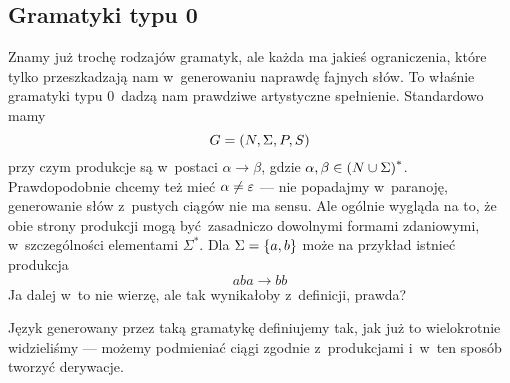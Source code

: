 \subsection{Gramatyki typu 0}
Znamy już trochę rodzajów gramatyk, ale każda ma jakieś ograniczenia, które tylko przeszkadzają nam w~generowaniu naprawdę fajnych słów. To właśnie gramatyki typu 0~dadzą nam prawdziwe artystyczne spełnienie. Standardowo mamy
\[
	G = \left(N, \Sigma, P, S\right)
\]
przy czym produkcje są w~postaci \(\alpha \rightarrow \beta\), gdzie \(\alpha, \beta \in \left(N \cup \Sigma\right)^*\). Prawdopodobnie chcemy też mieć \(\alpha \neq \varepsilon\) --- nie popadajmy w~paranoję, generowanie słów z~pustych ciągów nie ma sensu. Ale ogólnie wygląda na to, że obie strony produkcji mogą być zasadniczo dowolnymi formami zdaniowymi, w~szczególności elementami \(\Sigma^*\). Dla \(\Sigma = \set{a, b}\) może na przykład istnieć produkcja
\[
	aba \rightarrow bb
\]
Ja dalej w~to nie wierzę, ale tak wynikałoby z~definicji, prawda?

Język generowany przez taką gramatykę definiujemy tak, jak już to wielokrotnie widzieliśmy --- możemy podmieniać ciągi zgodnie z~produkcjami i~w~ten sposób tworzyć derywacje.

